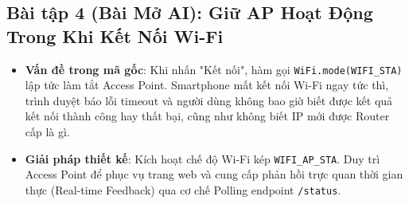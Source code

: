 \newpage
\subsection{Bài tập 4 (Bài Mở AI): Giữ AP Hoạt Động Trong Khi Kết Nối Wi-Fi}

\begin{tcolorbox}[
    enhanced, colback=black!2, colframe=black!60, boxrule=1pt, arc=2.5mm, drop shadow,
    attach boxed title to top left={xshift=4mm, yshift=-3mm},
    boxed title style={enhanced, colback=black!85, colframe=black!85, boxrule=1pt, arc=2.5mm, drop shadow, left=6pt, right=6pt, top=2pt, bottom=2pt},
    title=\textcolor{white}{\large\textbf{Vấn đề và Mục tiêu thiết kế Bài tập 4}}
]
\bfseries
\vspace{0.2cm}
\begin{itemize}
    \item \textbf{Vấn đề trong mã gốc}: Khi nhấn "Kết nối", hàm gọi \texttt{WiFi.mode(WIFI\_STA)} lập tức làm tắt Access Point. Smartphone mất kết nối Wi-Fi ngay tức thì, trình duyệt báo lỗi timeout và người dùng không bao giờ biết được kết quả kết nối thành công hay thất bại, cũng như không biết IP mới được Router cấp là gì.
    \item \textbf{Giải pháp thiết kế}: Kích hoạt chế độ Wi-Fi kép \texttt{WIFI\_AP\_STA}. Duy trì Access Point để phục vụ trang web và cung cấp phản hồi trực quan thời gian thực (Real-time Feedback) qua cơ chế Polling endpoint \texttt{/status}.
\end{itemize}
\end{tcolorbox}

